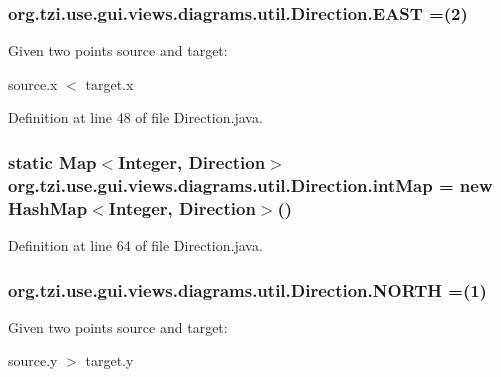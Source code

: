 \hypertarget{enumorg_1_1tzi_1_1use_1_1gui_1_1views_1_1diagrams_1_1util_1_1_direction_aac80ac44b96569997e2ba76091caebd6}{
\subsubsection[{E\-A\-S\-T}]{\setlength{\rightskip}{0pt plus 5cm}org.\-tzi.\-use.\-gui.\-views.\-diagrams.\-util.\-Direction.\-E\-A\-S\-T =(2)}}\label{enumorg_1_1tzi_1_1use_1_1gui_1_1views_1_1diagrams_1_1util_1_1_direction_aac80ac44b96569997e2ba76091caebd6}
Given two points {\ttfamily source} and {\ttfamily target}\-:\par
 {\ttfamily source.\-x $<$ target.\-x} 

Definition at line 48 of file Direction.\-java.

\hypertarget{enumorg_1_1tzi_1_1use_1_1gui_1_1views_1_1diagrams_1_1util_1_1_direction_aa15c7e41fd8701f9477ac4e3f681bb1d}{
\subsubsection[{int\-Map}]{\setlength{\rightskip}{0pt plus 5cm} static  Map$<$Integer, {\bf Direction}$>$ org.\-tzi.\-use.\-gui.\-views.\-diagrams.\-util.\-Direction.\-int\-Map = new Hash\-Map$<$Integer, {\bf Direction}$>$()\hspace{0.3cm}{\ttfamily [static]}}}\label{enumorg_1_1tzi_1_1use_1_1gui_1_1views_1_1diagrams_1_1util_1_1_direction_aa15c7e41fd8701f9477ac4e3f681bb1d}


Definition at line 64 of file Direction.\-java.

\hypertarget{enumorg_1_1tzi_1_1use_1_1gui_1_1views_1_1diagrams_1_1util_1_1_direction_a7cd10722c42ae81116a6b28d6cfd1945}{
\subsubsection[{N\-O\-R\-T\-H}]{\setlength{\rightskip}{0pt plus 5cm}org.\-tzi.\-use.\-gui.\-views.\-diagrams.\-util.\-Direction.\-N\-O\-R\-T\-H =(1)}}\label{enumorg_1_1tzi_1_1use_1_1gui_1_1views_1_1diagrams_1_1util_1_1_direction_a7cd10722c42ae81116a6b28d6cfd1945}
Given two points {\ttfamily source} and {\ttfamily target}\-:\par
 {\ttfamily source.\-y $>$ target.\-y} 


